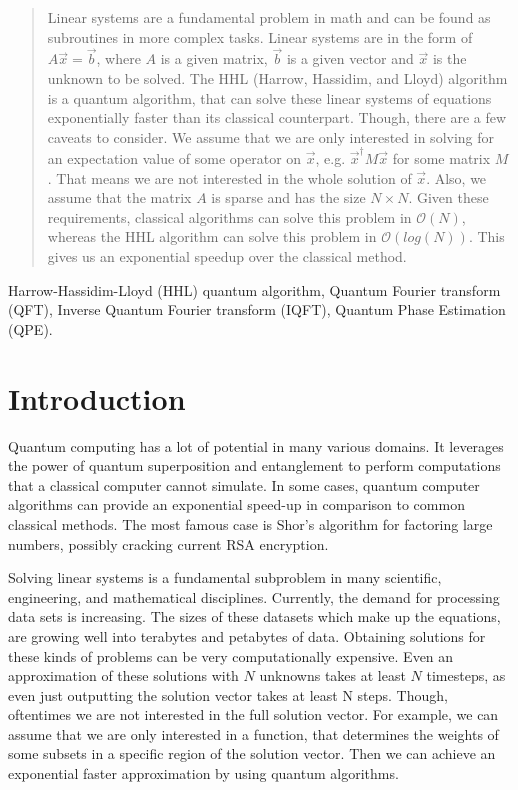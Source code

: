 \begin{abstract}
Linear systems are a fundamental problem in math and can be found as subroutines in more complex tasks.
Linear systems are in the form of $A \vec x = \vec b$, where $A$ is a given matrix, $\vec b$ is a given vector and $\vec x$ is the unknown to be solved.
The HHL (Harrow, Hassidim, and Lloyd) algorithm is a quantum algorithm, that can solve these linear systems of equations exponentially faster than its classical counterpart. 
Though, there are a few caveats to consider.
We assume that we are only interested in solving for an expectation value of some operator on $\vec x$, e.g. $\vec{x}^\dagger M \vec x$ for some matrix $M$.
That means we are not interested in the whole solution of $\vec x$.
Also, we assume that the matrix $A$ is sparse and has the size $N\times N$. 
Given these requirements, classical algorithms can solve this problem in $\mathcal{O}(N )$, whereas the HHL algorithm can solve this problem in $\mathcal{O}(log (N) )$.
This gives us an exponential speedup over the classical method.
\end{abstract}

\begin{IEEEkeywords}
Harrow-Hassidim-Lloyd (HHL) quantum algorithm, 
Quantum Fourier transform (QFT), 
Inverse Quantum Fourier transform (IQFT), 
Quantum Phase Estimation (QPE).
\end{IEEEkeywords}



\section{Introduction}


Quantum computing has a lot of potential in many various domains. 
It leverages the power of quantum superposition and entanglement to perform computations that a classical computer cannot simulate.
In some cases, quantum computer algorithms can provide an exponential speed-up in comparison to common classical methods.
The most famous case is Shor's algorithm for factoring large numbers, possibly cracking current RSA encryption.

Solving linear systems is a fundamental subproblem in many scientific, engineering, and mathematical disciplines. 
Currently, the demand for processing data sets is increasing. 
The sizes of these datasets which make up the equations, are growing well into terabytes and petabytes of data.
Obtaining solutions for these kinds of problems can be very computationally expensive.
Even an approximation of these solutions with $N$ unknowns takes at least $N$ timesteps, as even just outputting the solution vector takes at least N steps.
Though, oftentimes we are not interested in the full solution vector. 
For example, we can assume that we are only interested in a function, that determines the weights of some subsets in a specific region of the solution vector.
Then we can achieve an exponential faster approximation by using quantum algorithms. 


